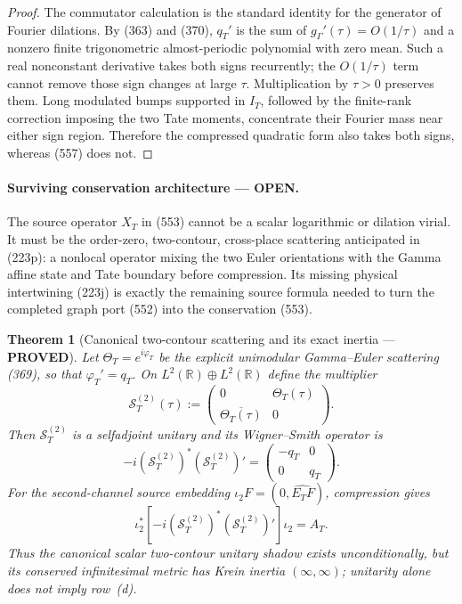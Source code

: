 \documentclass[11pt]{article}
\newtheorem{theorem}{Theorem}
\newcommand{\PROVED}{\textcolor{green!45!black}{\textbf{PROVED}}}
\newcommand{\OPEN}{\textcolor{red!70!black}{\textbf{OPEN}}}
\begin{document}
\begin{proof}
The commutator calculation is the standard identity for the generator of
Fourier dilations.  By (363) and (370), \(q_T'\) is the sum of
\(g_\Gamma'(\tau)=O(1/\tau)\) and a nonzero finite trigonometric
almost-periodic polynomial with zero mean.  Such a real nonconstant
derivative takes both signs recurrently; the \(O(1/\tau)\) term cannot
remove those sign changes at large \(\tau\).  Multiplication by
\(\tau>0\) preserves them.  Long modulated bumps supported in \(I_T\),
followed by the finite-rank correction imposing the two Tate moments,
concentrate their Fourier mass near either sign region.  Therefore the
compressed quadratic form also takes both signs, whereas (557) does not.
\end{proof}

\paragraph{Surviving conservation architecture --- \OPEN.}
The source operator \(X_T\) in (553) cannot be a scalar logarithmic or
dilation virial.  It must be the order-zero, two-contour, cross-place
scattering anticipated in (223p): a nonlocal operator mixing the two Euler
orientations with the Gamma affine state and Tate boundary before
compression.  Its missing physical intertwining (223j) is exactly the
remaining source formula needed to turn the completed graph port (552) into
the conservation (553).

\begin{theorem}[Canonical two-contour scattering and its exact inertia ---
\PROVED]
Let \(\Theta_T=e^{i\varphi_T}\) be the explicit unimodular
Gamma--Euler scattering (369), so that \(\varphi_T'=q_T\).  On
\(L^2(\mathbb R)\oplus L^2(\mathbb R)\) define the multiplier
\begin{equation}
 \mathscr S_T^{(2)}(\tau):=
 \begin{pmatrix}
 0&\Theta_T(\tau)\\
 \overline{\Theta_T(\tau)}&0
 \end{pmatrix}.                                      \tag{559}
\end{equation}
Then \(\mathscr S_T^{(2)}\) is a selfadjoint unitary and its
Wigner--Smith operator is
\begin{equation}
 -i(\mathscr S_T^{(2)})^*(\mathscr S_T^{(2)})'
 =\begin{pmatrix}-q_T&0\\0&q_T\end{pmatrix}.          \tag{560}
\end{equation}
For the second-channel source embedding
\(\iota_2F=(0,\widehat{E_TF})\), compression gives
\begin{equation}
 \iota_2^*
 \left[-i(\mathscr S_T^{(2)})^*(\mathscr S_T^{(2)})'\right]
 \iota_2=A_T.                                        \tag{561}
\end{equation}
Thus the canonical scalar two-contour unitary shadow exists unconditionally,
but its conserved infinitesimal metric has Krein inertia
\((\infty,\infty)\); unitarity alone does not imply row~(d).
\end{theorem}
\end{document}
